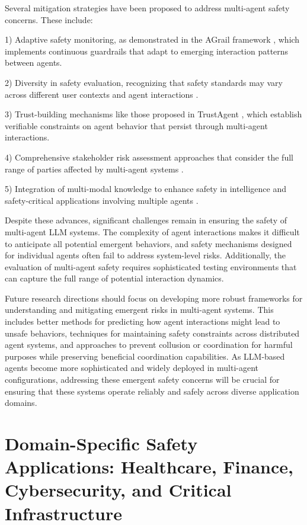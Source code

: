 \documentclass[conference]{IEEEtran}
\begin{document}
Several mitigation strategies have been proposed to address multi-agent safety concerns. These include:

1) Adaptive safety monitoring, as demonstrated in the AGrail framework \cite{2502.11448}, which implements continuous guardrails that adapt to emerging interaction patterns between agents.

2) Diversity in safety evaluation, recognizing that safety standards may vary across different user contexts and agent interactions \cite{2502.15086}.

3) Trust-building mechanisms like those proposed in TrustAgent \cite{2402.01586}, which establish verifiable constraints on agent behavior that persist through multi-agent interactions.

4) Comprehensive stakeholder risk assessment approaches that consider the full range of parties affected by multi-agent systems \cite{2403.13309}.

5) Integration of multi-modal knowledge to enhance safety in intelligence and safety-critical applications involving multiple agents \cite{2312.03088}.

Despite these advances, significant challenges remain in ensuring the safety of multi-agent LLM systems. The complexity of agent interactions makes it difficult to anticipate all potential emergent behaviors, and safety mechanisms designed for individual agents often fail to address system-level risks. Additionally, the evaluation of multi-agent safety requires sophisticated testing environments that can capture the full range of potential interaction dynamics.

Future research directions should focus on developing more robust frameworks for understanding and mitigating emergent risks in multi-agent systems. This includes better methods for predicting how agent interactions might lead to unsafe behaviors, techniques for maintaining safety constraints across distributed agent systems, and approaches to prevent collusion or coordination for harmful purposes while preserving beneficial coordination capabilities. As LLM-based agents become more sophisticated and widely deployed in multi-agent configurations, addressing these emergent safety concerns will be crucial for ensuring that these systems operate reliably and safely across diverse application domains.



\section{Domain-Specific Safety Applications: Healthcare, Finance, Cybersecurity, and Critical Infrastructure}
\end{document}
